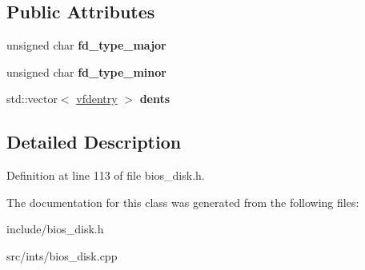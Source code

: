 \subsection*{Public Attributes}
\begin{DoxyCompactItemize}
\item 
\hypertarget{classimageDiskD88_ac78893683ee0ae39a20c484f66f4b93c}{unsigned char {\bfseries fd\-\_\-type\-\_\-major}}\label{classimageDiskD88_ac78893683ee0ae39a20c484f66f4b93c}

\item 
\hypertarget{classimageDiskD88_adee44970e1d1ef3ddb7c59074121afb6}{unsigned char {\bfseries fd\-\_\-type\-\_\-minor}}\label{classimageDiskD88_adee44970e1d1ef3ddb7c59074121afb6}

\item 
\hypertarget{classimageDiskD88_a9bff60346c5b14b0728d958cdcd4053a}{std\-::vector$<$ \hyperlink{structimageDiskD88_1_1vfdentry}{vfdentry} $>$ {\bfseries dents}}\label{classimageDiskD88_a9bff60346c5b14b0728d958cdcd4053a}

\end{DoxyCompactItemize}


\subsection{Detailed Description}


Definition at line 113 of file bios\-\_\-disk.\-h.



The documentation for this class was generated from the following files\-:\begin{DoxyCompactItemize}
\item 
include/bios\-\_\-disk.\-h\item 
src/ints/bios\-\_\-disk.\-cpp\end{DoxyCompactItemize}
